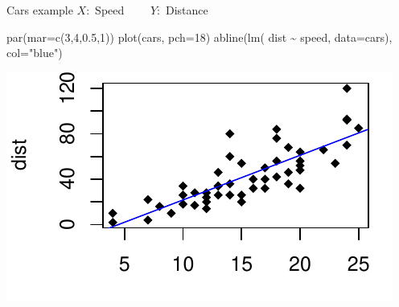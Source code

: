 \documentclass[
  ignorenonframetext,
]{beamer}
\newenvironment{Shaded}{\begin{snugshade}}{\end{snugshade}}
\newcommand{\AttributeTok}[1]{\textcolor[rgb]{0.77,0.63,0.00}{#1}}
\newcommand{\DecValTok}[1]{\textcolor[rgb]{0.00,0.00,0.81}{#1}}
\newcommand{\FloatTok}[1]{\textcolor[rgb]{0.00,0.00,0.81}{#1}}
\newcommand{\FunctionTok}[1]{\textcolor[rgb]{0.00,0.00,0.00}{#1}}
\newcommand{\NormalTok}[1]{#1}
\newcommand{\SpecialCharTok}[1]{\textcolor[rgb]{0.00,0.00,0.00}{#1}}
\newcommand{\StringTok}[1]{\textcolor[rgb]{0.31,0.60,0.02}{#1}}
\begin{document}
\begin{frame}[fragile]{Cars example}
\protect\hypertarget{cars-example-1}{}
\(X:\) Speed \(\qquad Y:\) Distance

\begin{Shaded}
\begin{Highlighting}[]
\FunctionTok{par}\NormalTok{(}\AttributeTok{mar=}\FunctionTok{c}\NormalTok{(}\DecValTok{3}\NormalTok{,}\DecValTok{4}\NormalTok{,}\FloatTok{0.5}\NormalTok{,}\DecValTok{1}\NormalTok{))}
\FunctionTok{plot}\NormalTok{(cars, }\AttributeTok{pch=}\DecValTok{18}\NormalTok{)}
\FunctionTok{abline}\NormalTok{(}\FunctionTok{lm}\NormalTok{( dist }\SpecialCharTok{\textasciitilde{}}\NormalTok{ speed, }\AttributeTok{data=}\NormalTok{cars), }\AttributeTok{col=}\StringTok{"blue"}\NormalTok{)}
\end{Highlighting}
\end{Shaded}

\includegraphics{Lec1_files/figure-beamer/cars2-1.pdf}
\end{frame}
\end{document}
